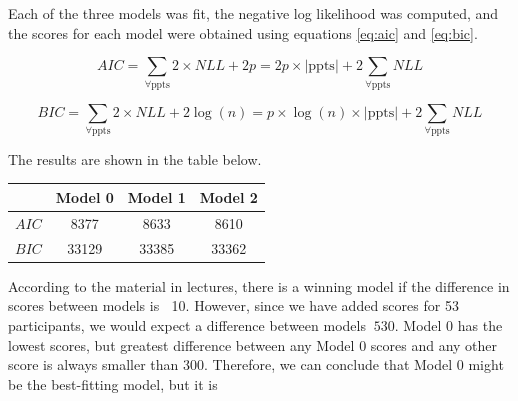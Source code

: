 \documentclass[12pt]{article}
\newtheorem*{theorem}{Theorem}
\begin{document}
Each of the three models was fit, the negative log likelihood was computed, and the scores for each model were obtained using equations \ref{eq:aic} and \ref{eq:bic}.

\begin{equation}
\label{eq:aic}
AIC = \sum_{\forall \mathrm{ppts}} 2 \times NLL + 2 p = 2 p \times |\mathrm{ppts}|  + 2 \sum_\mathrm{\forall \mathrm{ppts}} NLL
\end{equation}

\begin{equation}
BIC = \sum_{\forall \mathrm{ppts}} 2 \times NLL + 2 \log(n) =  p \times \log(n) \times |\mathrm{ppts}|  + 2 \sum_\mathrm{\forall \mathrm{ppts}} NLL
\label{eq:bic}
\end{equation}

The results are shown in the table below.


\begin{center}
 \begin{tabular}{|c || c | c | c |} 
 \hline
  & Model 0 & Model 1 & Model 2  \\ [0.5ex] 
 \hline\hline
 $AIC$ & 8377 & 8633 & 8610 \\
 \hline
 $BIC$ & 33129 & 33385 & 33362 \\ [1ex] 
 \hline
\end{tabular}
\end{center}

According to the material in lectures, there is a winning model if the difference in scores between models is $\>$ 10. However, since we have added scores for 53 participants, we would expect a difference between models $\> 530$. Model 0 has the lowest scores, but greatest difference between any Model 0 scores and any other score is always smaller than 300. Therefore, we can conclude that Model 0 might be the best-fitting model, but it is 





\newpage



\end{document}
